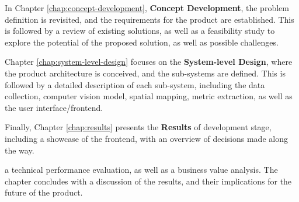 In Chapter \ref{chap:concept-development}, \textbf{Concept Development}, the problem definition is revisited, and the requirements for the product are established. This is followed by a review of existing solutions, as well as a feasibility study to explore the potential of the proposed solution, as well as possible challenges.

Chapter \ref{chap:system-level-design} focuses on the \textbf{System-level Design}, where the product architecture is conceived, and the sub-systems are defined. This is followed by a detailed description of each sub-system, including the data collection, computer vision model, spatial mapping, metric extraction, as well as the user interface/frontend.

Finally, Chapter \ref{chap:results} presents the \textbf{Results} of development stage, including a showcase of the frontend, with an overview of decisions made along the way.

a technical performance evaluation, as well as a business value analysis. The chapter concludes with a discussion of the results, and their implications for the future of the product.